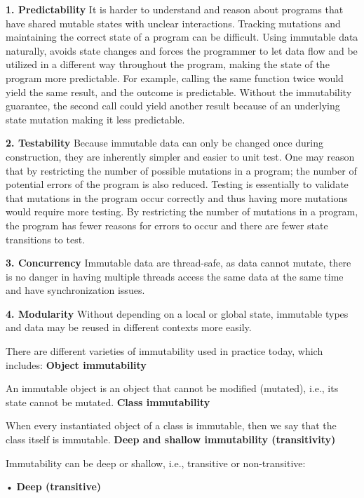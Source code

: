 \documentclass[conference]{IEEEtran}
\begin{document}
\textbf{1. Predictability} It is harder to understand and reason about programs that have shared mutable
states with unclear interactions. Tracking mutations and maintaining the correct state of a program
can be difficult. Using immutable data naturally, avoids state changes and forces the programmer
to let data flow and be utilized in a different way throughout the program, making the state of the
program more predictable. For example, calling the same function twice would yield the same result,
and the outcome is predictable. Without the immutability guarantee, the second call could
yield another result because of an underlying state mutation making it less predictable.

\textbf{2. Testability} Because immutable data can only be changed once during construction, they are inherently
simpler and easier to unit test. One may reason that by restricting the number of possible mutations
in a program; the number of potential errors of the program is also reduced. Testing is essentially
to validate that mutations in the program occur correctly and thus having more mutations would require more testing. By restricting the number of mutations in a program, the program has
fewer reasons for errors to occur and there are fewer state transitions to test.

\textbf{3. Concurrency} Immutable data are thread-safe, as data cannot mutate, there is no danger in having
multiple threads access the same data at the same time and have synchronization issues.

\textbf{4. Modularity} Without depending on a local or global state, immutable types and data may be reused
in different contexts more easily.

There are different varieties of immutability used in practice today, which includes:\newline
\textbf{Object immutability}

An immutable object is an object that cannot be modified (mutated), i.e., its state cannot be mutated.\newline
\textbf{Class immutability}

When every instantiated object of a class is immutable, then we say that the class itself is immutable.\newline
\textbf{Deep and shallow immutability (transitivity)}

 Immutability can be deep or shallow, i.e., transitive or non-transitive:

 • \textbf{Deep (transitive)}
\end{document}
